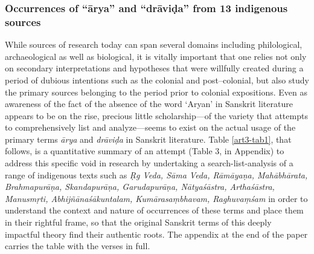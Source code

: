 \subsubsection{Occurrences of “ārya” and “drāviḍa” from 13 indigenous sources}

While sources of research today can span several domains including philological, archaeological as well as biological, it is vitally important that one relies not only on secondary interpretations and hypotheses that were willfully created during a period of dubious intentions such as the colonial and post–colonial, but also study the primary sources belonging to the period prior to colonial expositions. Even as awareness of the fact of the absence of the word ‘Aryan’ in Sanskrit literature appears to be on the rise, precious little scholarship—of the variety that attempts to comprehensively list and analyze—seems to exist on the actual usage of the primary terms \textit{ārya} and \textit{drāviḍa} in Sanskrit literature. Table \ref{art3-tab1}, that follows, is a quantitative summary of an attempt (Table 3, in Appendix) to address this specific void in research by undertaking a search-list-analysis of a range of indigenous texts such as \textit{Ṛg Veda, Sāma Veda, Rāmāyaṇa, Mahābhārata, Brahmapurāṇa, Skandapurāṇa, Garudapurāṇa, Nātyaśāstra, Arthaśāstra, Manusmṛti, Abhijñānaśākuntalam, Kumārasaṃbhavam, Raghuvaṃśam} in order to understand the context and nature of occurrences of these terms and place them in their rightful frame, so that the original Sanskrit terms of this deeply impactful theory find their authentic roots. The appendix at the end of the paper carries the table with the verses in full.

